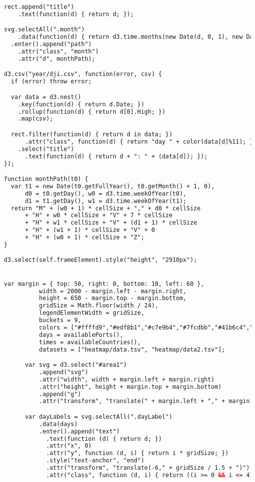 \begin{lstlisting}[language=HTML]
rect.append("title")
    .text(function(d) { return d; });

svg.selectAll(".month")
    .data(function(d) { return d3.time.months(new Date(d, 0, 1), new Date(d + 1, 0, 1)); })
  .enter().append("path")
    .attr("class", "month")
    .attr("d", monthPath);

d3.csv("year/dji.csv", function(error, csv) {
  if (error) throw error;

  var data = d3.nest()
    .key(function(d) { return d.Date; })
    .rollup(function(d) { return d[0].High; })
    .map(csv);

  rect.filter(function(d) { return d in data; })
      .attr("class", function(d) { return "day " + color(data[d]%11); })
    .select("title")
      .text(function(d) { return d + ": " + (data[d]); });
});

function monthPath(t0) {
  var t1 = new Date(t0.getFullYear(), t0.getMonth() + 1, 0),
      d0 = t0.getDay(), w0 = d3.time.weekOfYear(t0),
      d1 = t1.getDay(), w1 = d3.time.weekOfYear(t1);
  return "M" + (w0 + 1) * cellSize + "," + d0 * cellSize
      + "H" + w0 * cellSize + "V" + 7 * cellSize
      + "H" + w1 * cellSize + "V" + (d1 + 1) * cellSize
      + "H" + (w1 + 1) * cellSize + "V" + 0
      + "H" + (w0 + 1) * cellSize + "Z";
}

d3.select(self.frameElement).style("height", "2910px");


var margin = { top: 50, right: 0, bottom: 10, left: 60 },
          width = 2000 - margin.left - margin.right,
          height = 650 - margin.top - margin.bottom,
          gridSize = Math.floor(width / 24),
          legendElementWidth = gridSize,
          buckets = 9,
          colors = ["#ffffd9","#edf8b1","#c7e9b4","#7fcdbb","#41b6c4","#1d91c0","#225ea8","#253494","#081d58"], // alternatively colorbrewer.YlGnBu[9]
          days = availablePorts(),
          times = availableCountries(),
          datasets = ["heatmap/data.tsv", "heatmap/data2.tsv"];

      var svg = d3.select("#area1")
          .append("svg")
          .attr("width", width + margin.left + margin.right)
          .attr("height", height + margin.top + margin.bottom)
          .append("g")
          .attr("transform", "translate(" + margin.left + "," + margin.top + ")");

      var dayLabels = svg.selectAll(".dayLabel")
          .data(days)
          .enter().append("text")
            .text(function (d) { return d; })
            .attr("x", 0)
            .attr("y", function (d, i) { return i * gridSize; })
            .style("text-anchor", "end")
            .attr("transform", "translate(-6," + gridSize / 1.5 + ")")
            .attr("class", function (d, i) { return ((i >= 0 && i <= 4) ? "dayLabel mono axis axis-workweek" : "dayLabel mono axis"); });


\end{lstlisting}
